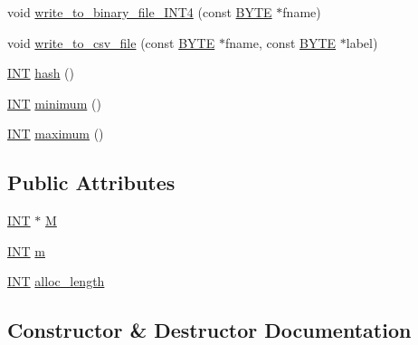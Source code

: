 \begin{DoxyCompactItemize}
void \mbox{\hyperlink{class_i_n_t__vector_ad831ab13ad11e98bd0e59a45b0930a99}{write\+\_\+to\+\_\+binary\+\_\+file\+\_\+\+I\+N\+T4}} (const \mbox{\hyperlink{galois_8h_ab6cc7b4aeb6ea31aba2b3fbfc83ff5e6}{B\+Y\+TE}} $\ast$fname)
\item 
void \mbox{\hyperlink{class_i_n_t__vector_a76087dbd91e6305c5020871623a57f5c}{write\+\_\+to\+\_\+csv\+\_\+file}} (const \mbox{\hyperlink{galois_8h_ab6cc7b4aeb6ea31aba2b3fbfc83ff5e6}{B\+Y\+TE}} $\ast$fname, const \mbox{\hyperlink{galois_8h_ab6cc7b4aeb6ea31aba2b3fbfc83ff5e6}{B\+Y\+TE}} $\ast$label)
\item 
\mbox{\hyperlink{galois_8h_a09fddde158a3a20bd2dcadb609de11dc}{I\+NT}} \mbox{\hyperlink{class_i_n_t__vector_a5316b2d7668325743b26ac18fcb550a2}{hash}} ()
\item 
\mbox{\hyperlink{galois_8h_a09fddde158a3a20bd2dcadb609de11dc}{I\+NT}} \mbox{\hyperlink{class_i_n_t__vector_add61d437c43370a9e69dbceddb30ec1a}{minimum}} ()
\item 
\mbox{\hyperlink{galois_8h_a09fddde158a3a20bd2dcadb609de11dc}{I\+NT}} \mbox{\hyperlink{class_i_n_t__vector_a5b454cd49b356decfa942892c7ce2b51}{maximum}} ()
\end{DoxyCompactItemize}
\subsection*{Public Attributes}
\begin{DoxyCompactItemize}
\item 
\mbox{\hyperlink{galois_8h_a09fddde158a3a20bd2dcadb609de11dc}{I\+NT}} $\ast$ \mbox{\hyperlink{class_i_n_t__vector_a7dd0dba739fad21b7b6ea4b214b38846}{M}}
\item 
\mbox{\hyperlink{galois_8h_a09fddde158a3a20bd2dcadb609de11dc}{I\+NT}} \mbox{\hyperlink{class_i_n_t__vector_a097fdc0fae16f103ddb6b57d89203334}{m}}
\item 
\mbox{\hyperlink{galois_8h_a09fddde158a3a20bd2dcadb609de11dc}{I\+NT}} \mbox{\hyperlink{class_i_n_t__vector_ade027034d125bc7a714175a41e518c90}{alloc\+\_\+length}}
\end{DoxyCompactItemize}


\subsection{Constructor \& Destructor Documentation}
\mbox{\label{class_i_n_t__vector_a6c615763a83da3f628f9fcc74e9f15a2}} 
